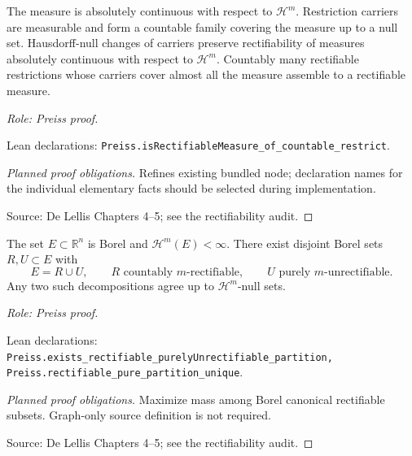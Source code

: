 \begin{lemma}
\label{lem:carrier-calculus}







The measure is absolutely continuous with respect to \(\mathcal H^m\). Restriction carriers are measurable and form a countable family covering the measure up to a null set.
Hausdorff-null changes of carriers preserve rectifiability of measures absolutely continuous with respect to \(\mathcal H^m\). Countably many rectifiable restrictions whose carriers cover almost all the measure assemble to a rectifiable measure.
\par\emph{Role: Preiss proof.}
\par Lean declarations: \texttt{Preiss.isRectifiableMeasure\_of\_countable\_restrict}.
\end{lemma}
\begin{proof}[Planned proof obligations]

Refines existing bundled node; declaration names for the individual elementary facts should be selected during implementation.
\par Source: De Lellis Chapters 4--5; see the rectifiability audit.
\end{proof}

\begin{lemma}
\label{lem:decomposition}







The set \(E\subset\mathbb R^n\) is Borel and \(\mathcal H^m(E)<\infty\).
There exist disjoint Borel sets \(R,U\subset E\) with
\[
 E=R\cup U,\qquad R\text{ countably \(m\)-rectifiable},\qquad
 U\text{ purely \(m\)-unrectifiable}.
\]
Any two such decompositions agree up to \(\mathcal H^m\)-null sets.
\par\emph{Role: Preiss proof.}
\par Lean declarations: \texttt{Preiss.exists\_rectifiable\_purelyUnrectifiable\_partition, Preiss.rectifiable\_pure\_partition\_unique}.
\end{lemma}
\begin{proof}[Planned proof obligations]

Maximize mass among Borel canonical rectifiable subsets. Graph-only source definition is not required.
\par Source: De Lellis Chapters 4--5; see the rectifiability audit.
\end{proof}

